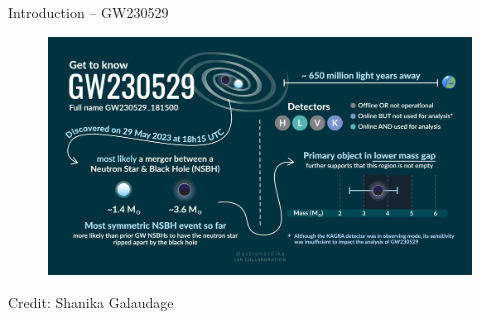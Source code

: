 \documentclass[usenames,dvipsnames,t]{beamer}
\begin{document}
\begin{frame}{Introduction -- GW230529}

  \begin{figure}
    \centering
    \includegraphics[width=1\linewidth]{Figures/GetToKnowGW230529_English.png}
  \end{figure}

  \scriptsize Credit: Shanika Galaudage \normalsize
\end{frame}
    
\end{document}

